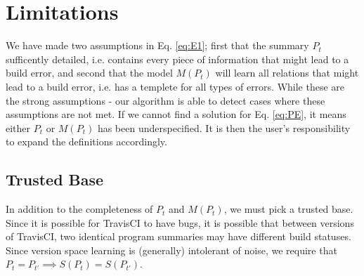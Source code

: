 \section{Limitations}

We have made two assumptions in Eq. \ref{eq:E1}; first that the summary $P_t$ sufficently detailed, i.e. contains every piece of information that might lead to a build error, and second that the model $M(P_t)$ will learn all relations that might lead to a build error, i.e. has a templete for all types of errors.
While these are the strong assumptions - our algorithm is able to detect cases where these assumptions are not met.
If we cannot find a solution for Eq. \ref{eq:PE}, it means either $P_t$ or $M(P_t)$ has been underspecified.
It is then the user's responsibility to expand the definitions accordingly.

\subsection{Trusted Base}
In addition to the completeness of $P_t$ and $M(P_t)$, we must pick a trusted base.
Since it is possible for TravisCI to have bugs, it is possible that between versions of TravisCI, two identical program summaries may have different build statuses.
Since version space learning is (generally) intolerant of noise, we require that
$P_t = P_{t'} \implies S(P_t) = S(P_{t'})$.
